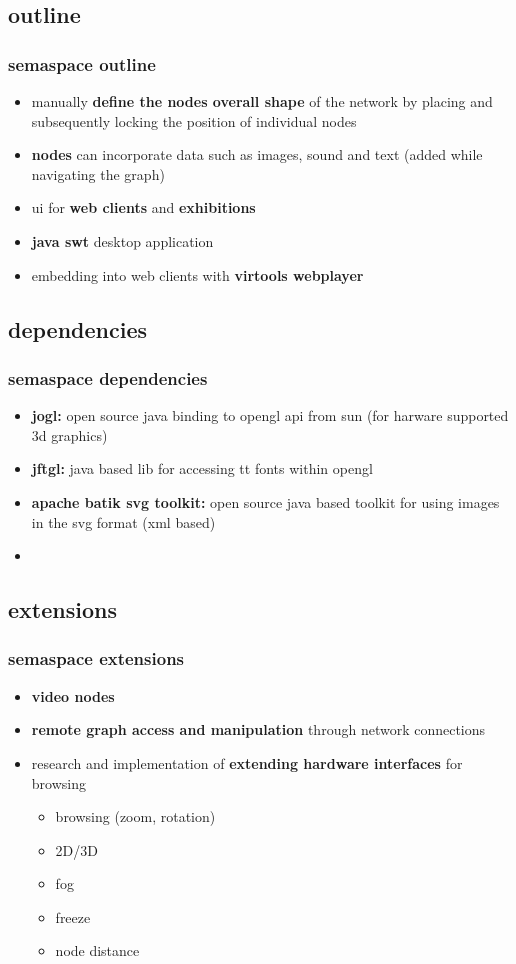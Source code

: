 \documentclass[blue]{beamer}
\begin{document}
\subsection{outline}
\frame
{
\frametitle{\textbf{semaspace outline}}
\begin{itemize}
	\item manually \textbf{define the nodes overall shape} of the network by placing and subsequently locking the position of individual nodes
	\item \textbf{nodes} can incorporate data such as images, sound and text (added while navigating the graph)
	\item ui for \textbf{web clients} and \textbf{exhibitions}
	\item \textbf{java swt} desktop application
	\item embedding into web clients with \textbf{virtools webplayer}
\end{itemize}
}

\subsection{dependencies}
\frame
{
\frametitle{\textbf{semaspace dependencies}}
\begin{itemize}
	\item \textbf{jogl:} open source java binding to opengl api from sun (for harware supported 3d graphics)
	\item \textbf{jftgl:} java based lib for accessing tt fonts within opengl
	\item \textbf{apache batik svg toolkit:} open source java based toolkit for using images in the svg format (xml based)
	\item \textbf{}
\end{itemize}
}


\subsection{extensions}
\frame
{
\frametitle{\textbf{semaspace extensions}}
\begin{itemize}
	\item \textbf{video nodes}
	\item \textbf{remote graph access and manipulation} through network connections
	\item research and implementation of \textbf{extending hardware interfaces} for browsing
		\begin{itemize}[<+-|alert@+>]
			\item browsing (zoom, rotation)
			\item 2D/3D
			\item fog
			\item freeze
			\item node distance
		\end{itemize}
\end{itemize}
}
\end{document}
